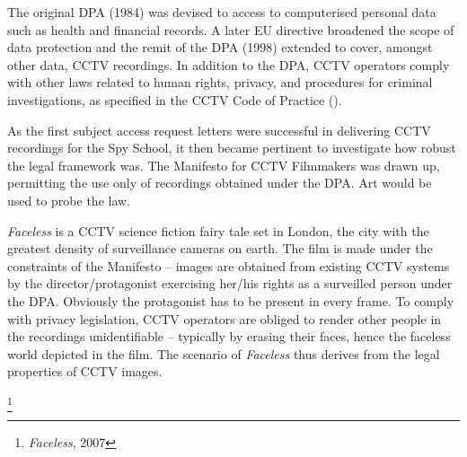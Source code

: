 {The original DPA (1984) was devised to  access to
computerised personal data such as health and financial records. A
later EU directive broadened the scope of data protection and the remit
of the DPA (1998) extended to cover, amongst other data, CCTV
recordings. In addition to the DPA, CCTV operators  comply with
other laws related to human rights, privacy, and procedures for
criminal investigations, as specified in the CCTV Code of Practice
().

As the first subject access request letters were successful in
delivering CCTV recordings for the Spy School, it then became pertinent
to investigate how robust the legal framework was. The Manifesto for
CCTV Filmmakers was drawn up, permitting the use only of recordings
obtained under the DPA. Art would be used to probe the law.



{\em Faceless} is a CCTV science fiction fairy tale set in London,
the city with the greatest density of surveillance cameras on earth.
The film is made under the constraints of the Manifesto {--} images are
obtained from existing CCTV systems by the director/protagonist
exercising her/his rights as a surveilled person under the DPA.
Obviously the protagonist has to be present in every frame. To comply
with privacy legislation, CCTV operators are obliged to render other
people in the recordings unidentifiable {--} typically by erasing their
faces, hence the faceless world depicted in the film. The scenario of
{\em Faceless} thus derives from the legal properties of CCTV
images.

 \footnote{{\em Faceless}, 2007}

}
